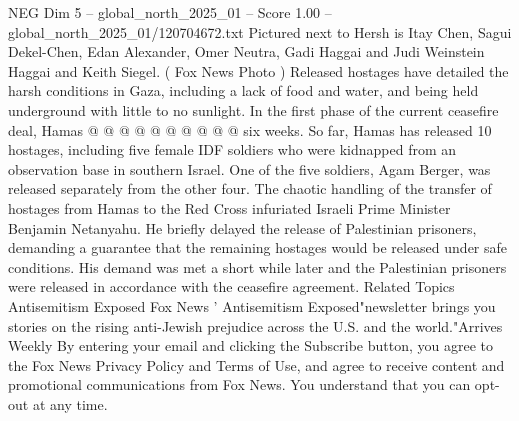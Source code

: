 \begin{textsample}{NEG Dim 5 – global\_north\_2025\_01 – Score 1.00 – global\_north\_2025\_01/120704672.txt}
Pictured next to Hersh is Itay Chen, Sagui Dekel-Chen, Edan Alexander, Omer Neutra, Gadi Haggai and Judi Weinstein Haggai and Keith Siegel. ( Fox News Photo ) Released hostages have detailed the harsh conditions in Gaza, including a lack of food and water, and being held underground with little to no sunlight.
In the first phase of the current ceasefire deal, Hamas @ @ @ @ @ @ @ @ @ @ six weeks.
So far, Hamas has released 10 hostages, including five female IDF soldiers who were kidnapped from an observation base in southern Israel.
One of the five soldiers, Agam Berger, was released separately from the other four.
The chaotic handling of the transfer of hostages from Hamas to the Red Cross infuriated Israeli Prime Minister Benjamin Netanyahu.
He briefly delayed the release of Palestinian prisoners, demanding a guarantee that the remaining hostages would be released under safe conditions.
His demand was met a short while later and the Palestinian prisoners were released in accordance with the ceasefire agreement.
Related Topics Antisemitism Exposed Fox News ' Antisemitism Exposed"newsletter brings you stories on the rising anti-Jewish prejudice across the U.S. and the world."Arrives Weekly By entering your email and clicking the Subscribe button, you agree to the Fox News Privacy Policy and Terms of Use, and agree to receive content and promotional communications from Fox News.
You understand that you can opt-out at any time.

\end{textsample}
